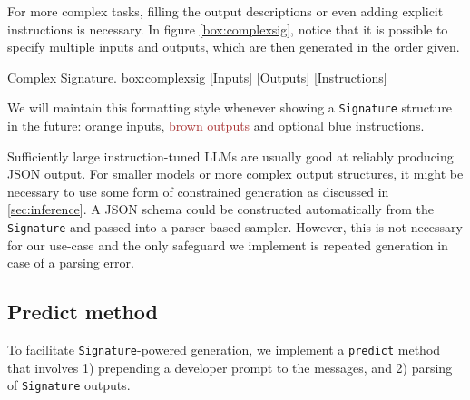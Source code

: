 For more complex tasks, filling the output descriptions or even adding explicit instructions is necessary.
In figure \ref{box:complexsig}, notice that it is possible to specify multiple inputs and outputs, which are then generated in the order given.

\begin{figurebox}{Complex Signature. }{box:complexsig}
    [Inputs]
    [Outputs] 
    [Instructions]
\end{figurebox}

We will maintain this formatting style whenever showing a \texttt{Signature} structure in the future: \textcolor{ctuorange}{orange inputs}, \textcolor{brown}{brown outputs} and optional \textcolor{ctublue}{blue instructions}.

Sufficiently large instruction-tuned LLMs are usually good at reliably producing JSON output.
For smaller models or more complex output structures, it might be necessary to use some form of constrained generation as discussed in \ref{sec:inference}.
A JSON schema could be constructed automatically from the \texttt{Signature} and passed into a parser-based sampler.
However, this is not necessary for our use-case and the only safeguard we implement is repeated generation in case of a parsing error.

\subsection{Predict method}
To facilitate \texttt{Signature}-powered generation, we implement a \texttt{predict} method that 
involves 1) prepending a developer prompt to the messages, and 2) parsing of \texttt{Signature} outputs.

